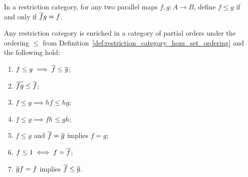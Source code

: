 \begin{definition}\label{def:restriction_category_hom_set_ordering}
  In a restriction category, for any two parallel maps  $f,g:A\to B$, define $f \le g$ if and only if
  $\overline{f} g = f$.
\end{definition}

\begin{lemma}\label{lem:restriction_cats_are_partial_order_enriched}
  Any restriction category \X is enriched in a category of partial orders under the ordering $\le$
  from  Definition~\ref{def:restriction_category_hom_set_ordering} and the following hold:
  \begin{multicols}{2}
    \begin{enumerate}[{(}i{)}]
      \item $f \le g \implies \overline{f} \le \overline{g}$;\label{lemitem:rst_ordering_2}
      \item $\overline{f g} \le \overline{f}$; \label{lemitem:rst_ordering_3}
      \item $f \le g \implies h f \le h g$;
      \item $f \le g \implies f h \le g h$;
      \item $f \le g$ and $\overline{f} = \overline{g}$ implies $f = g$;
      \item $f \le 1 \iff f = \overline{f}$;
      \item $\overline{g}f = f$ implies $\overline{f} \le \overline{g}$.
    \end{enumerate}
  \end{multicols}
\end{lemma}
